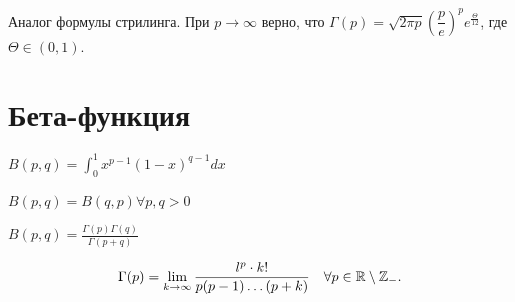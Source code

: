 \begin{note} Аналог формулы стрилинга.
     При $p \to \infty $  верно, что $\Gamma (p) = \sqrt {2 \pi p} \left( \dfrac{p}{e} \right) ^p e^{\frac{\Theta}{12}}$, где $\Theta \in (0, 1)$.
\end{note}

\section{Бета-функция}

\begin{definition}
    $B(p, q) = \int_0^1 x^{p-1}(1-x)^{q-1}dx$

    $B(p, q) = B(q, p) \forall p, q > 0$

    $B(p, q) = \frac{\Gamma(p)\Gamma(q)}{\Gamma(p + q)}$
\end{definition}

\begin{theorem}

    \[
    \Gamma(p) = \lim_{k \to \infty} \frac{l^p \cdot k!}{p(p-1) \ldots (p+k)} \quad \forall p\in \R\setminus \Z _-
    .\]
\end{theorem}

